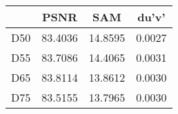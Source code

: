 \begin{tabular}{cccc}
  \hline
   & PSNR & SAM & du'v' \\
  \hline
  D50 & 83.4036 & 14.8595 & 0.0027 \\
  D55 & 83.7086 & 14.4065 & 0.0031 \\
  D65 & 83.8114 & 13.8612 & 0.0030 \\
  D75 & 83.5155 & 13.7965 & 0.0030 \\
  \hline
\end{tabular}

